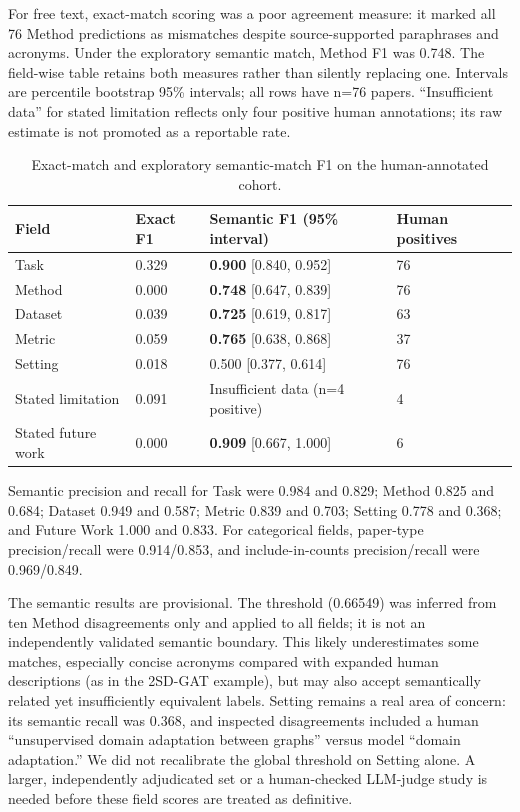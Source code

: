 \documentclass[sigconf,review,anonymous]{acmart}
\begin{document}
For free text, exact-match scoring was a poor agreement measure: it marked all 76 Method predictions as mismatches despite source-supported paraphrases and acronyms. Under the exploratory semantic match, Method F1 was 0.748. The field-wise table retains both measures rather than silently replacing one. Intervals are percentile bootstrap 95\% intervals; all rows have n=76 papers. “Insufficient data” for stated limitation reflects only four positive human annotations; its raw estimate is not promoted as a reportable rate.

\begin{table}[t]
\centering
\small
\setlength{\tabcolsep}{3pt}
\begin{tabularx}{\textwidth}{>{\raggedright\arraybackslash}XYYY}
\toprule
Field & Exact F1 & Semantic F1 (95\% interval) & Human positives \\
\midrule
Task & 0.329 & \textbf{0.900} [0.840, 0.952] & 76 \\
Method & 0.000 & \textbf{0.748} [0.647, 0.839] & 76 \\
Dataset & 0.039 & \textbf{0.725} [0.619, 0.817] & 63 \\
Metric & 0.059 & \textbf{0.765} [0.638, 0.868] & 37 \\
Setting & 0.018 & 0.500 [0.377, 0.614] & 76 \\
Stated limitation & 0.091 & Insufficient data (n=4 positive) & 4 \\
Stated future work & 0.000 & \textbf{0.909} [0.667, 1.000] & 6 \\
\bottomrule
\end{tabularx}
\caption{Exact-match and exploratory semantic-match F1 on the human-annotated cohort.}
\end{table}

Semantic precision and recall for Task were 0.984 and 0.829; Method 0.825 and 0.684; Dataset 0.949 and 0.587; Metric 0.839 and 0.703; Setting 0.778 and 0.368; and Future Work 1.000 and 0.833. For categorical fields, paper-type precision/recall were 0.914/0.853, and include-in-counts precision/recall were 0.969/0.849.

The semantic results are provisional. The threshold (0.66549) was inferred from ten Method disagreements only and applied to all fields; it is not an independently validated semantic boundary. This likely underestimates some matches, especially concise acronyms compared with expanded human descriptions (as in the 2SD-GAT example), but may also accept semantically related yet insufficiently equivalent labels. Setting remains a real area of concern: its semantic recall was 0.368, and inspected disagreements included a human “unsupervised domain adaptation between graphs” versus model “domain adaptation.” We did not recalibrate the global threshold on Setting alone. A larger, independently adjudicated set or a human-checked LLM-judge study is needed before these field scores are treated as definitive.
\end{document}
